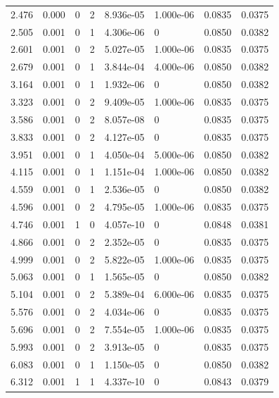 \documentclass[preview]{standalone}
\begin{document}
{{\begin{tabular}{L{1.2cm}C{1.2cm} C{0.3cm}C{0.5cm} C{1.4cm}C{1.4cm} C{1.4cm}C{1.4cm}}
  2.476  &  0.000  & 0     &  2 &  8.936e-05  & 1.000e-06  & 0.0835 &  0.0375   \\ 
  2.505  &  0.001  & 0     &  1 &  4.306e-06  & 0  & 0.0850 &  0.0382   \\ 
  2.601  &  0.001  & 0     &  2 &  5.027e-05  & 1.000e-06  & 0.0835 &  0.0375   \\ 
  2.679  &  0.001  & 0     &  1 &  3.844e-04  & 4.000e-06  & 0.0850 &  0.0382   \\ 
  3.164  &  0.001  & 0     &  1 &  1.932e-06  & 0  & 0.0850 &  0.0382   \\ 
  3.323  &  0.001  & 0     &  2 &  9.409e-05  & 1.000e-06  & 0.0835 &  0.0375   \\ 
  3.586  &  0.001  & 0     &  2 &  8.057e-08  & 0  & 0.0835 &  0.0375   \\ 
  3.833  &  0.001  & 0     &  2 &  4.127e-05  & 0  & 0.0835 &  0.0375   \\ 
  3.951  &  0.001  & 0     &  1 &  4.050e-04  & 5.000e-06  & 0.0850 &  0.0382   \\ 
  4.115  &  0.001  & 0     &  1 &  1.151e-04  & 1.000e-06  & 0.0850 &  0.0382   \\ 
  4.559  &  0.001  & 0     &  1 &  2.536e-05  & 0  & 0.0850 &  0.0382   \\ 
  4.596  &  0.001  & 0     &  2 &  4.795e-05  & 1.000e-06  & 0.0835 &  0.0375   \\ 
  4.746  &  0.001  & 1     &  0 &  4.057e-10  & 0  & 0.0848 &  0.0381   \\ 
  4.866  &  0.001  & 0     &  2 &  2.352e-05  & 0  & 0.0835 &  0.0375   \\ 
  4.999  &  0.001  & 0     &  2 &  5.822e-05  & 1.000e-06  & 0.0835 &  0.0375   \\ 
  5.063  &  0.001  & 0     &  1 &  1.565e-05  & 0  & 0.0850 &  0.0382   \\ 
  5.104  &  0.001  & 0     &  2 &  5.389e-04  & 6.000e-06  & 0.0835 &  0.0375   \\ 
  5.576  &  0.001  & 0     &  2 &  4.034e-06  & 0  & 0.0835 &  0.0375   \\ 
  5.696  &  0.001  & 0     &  2 &  7.554e-05  & 1.000e-06  & 0.0835 &  0.0375   \\ 
  5.993  &  0.001  & 0     &  2 &  3.913e-05  & 0  & 0.0835 &  0.0375   \\ 
  6.083  &  0.001  & 0     &  1 &  1.150e-05  & 0  & 0.0850 &  0.0382   \\ 
  6.312  &  0.001  & 1     &  1 &  4.337e-10  & 0  & 0.0843 &  0.0379   \\ 

\end{tabular}}}
\end{document}
